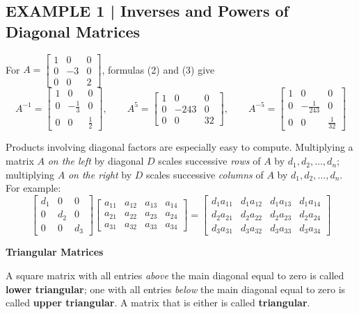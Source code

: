 \documentclass{article}
\newcommand{\redheading}[1]{{\vspace{2mm}\noindent\Large\bfseries\color{red!55!black} #1\par}\vspace{2mm}}
\theoremstyle{mystyle}
\begin{document}
\subsection*{EXAMPLE 1 | Inverses and Powers of Diagonal Matrices}
For $A=\begin{bmatrix}1&0&0\\0&-3&0\\0&0&2\end{bmatrix}$, formulas (2) and (3) give
\[
A^{-1}=\begin{bmatrix}1&0&0\\0&-\frac{1}{3}&0\\0&0&\frac{1}{2}\end{bmatrix},\qquad
A^5=\begin{bmatrix}1&0&0\\0&-243&0\\0&0&32\end{bmatrix},\qquad
A^{-5}=\begin{bmatrix}1&0&0\\0&-\frac{1}{243}&0\\0&0&\frac{1}{32}\end{bmatrix}
\]

Products involving diagonal factors are especially easy to compute. Multiplying a matrix $A$ \emph{on the left} by diagonal $D$ scales successive \emph{rows} of $A$ by $d_1,d_2,\ldots,d_n$; multiplying $A$ \emph{on the right} by $D$ scales successive \emph{columns} of $A$ by $d_1,d_2,\ldots,d_n$. For example:
\[
\begin{bmatrix}d_1&0&0\\0&d_2&0\\0&0&d_3\end{bmatrix}
\begin{bmatrix}a_{11}&a_{12}&a_{13}&a_{14}\\a_{21}&a_{22}&a_{23}&a_{24}\\a_{31}&a_{32}&a_{33}&a_{34}\end{bmatrix}
=
\begin{bmatrix}d_1a_{11}&d_1a_{12}&d_1a_{13}&d_1a_{14}\\d_2a_{21}&d_2a_{22}&d_2a_{23}&d_2a_{24}\\d_3a_{31}&d_3a_{32}&d_3a_{33}&d_3a_{34}\end{bmatrix}
\]

\redheading{Triangular Matrices}

A square matrix with all entries \emph{above} the main diagonal equal to zero is called \textbf{lower triangular}; one with all entries \emph{below} the main diagonal equal to zero is called \textbf{upper triangular}. A matrix that is either is called \textbf{triangular}.
\end{document}
